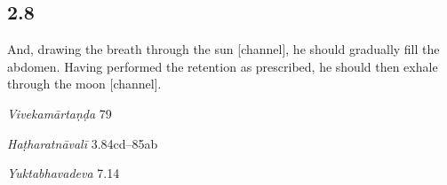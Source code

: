 \begin{ekdosis}
\begin{testimonia}[hp02_007]
\begin{versinnote}
\end{versinnote}
\end{testimonia}


\subsection*{2.8}
\begin{translation}[hp02_008]
And, drawing the breath through the sun [channel], he should gradually fill the abdomen. Having performed the retention as prescribed, he should then exhale through the moon [channel].
\end{translation}

\begin{sources}[hp02_008]
\emph{Vivekamārtaṇḍa} 79

\begin{versinnote}
\end{versinnote}
\end{sources}

\begin{testimonia}[hp02_008]
\emph{Haṭharatnāvalī} 3.84cd–85ab
\begin{versinnote}
\end{versinnote}

\emph{Yuktabhavadeva} 7.14

\begin{versinnote}
\end{versinnote}
\end{testimonia}


\end{ekdosis}
